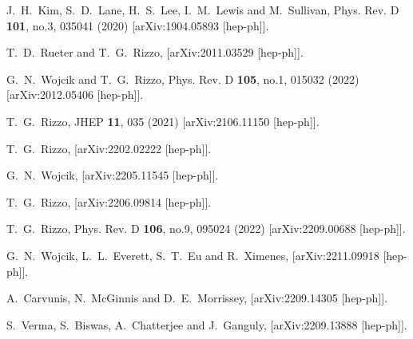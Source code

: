 \documentclass[14pt]{article}
\begin{document}
{\begin{thebibliography}{99}
J.~H.~Kim, S.~D.~Lane, H.~S.~Lee, I.~M.~Lewis and M.~Sullivan,
Phys. Rev. D \textbf{101}, no.3, 035041 (2020)
[arXiv:1904.05893 [hep-ph]].

T.~D.~Rueter and T.~G.~Rizzo,
[arXiv:2011.03529 [hep-ph]].

G.~N.~Wojcik and T.~G.~Rizzo,
Phys. Rev. D \textbf{105}, no.1, 015032 (2022)
[arXiv:2012.05406 [hep-ph]].

T.~G.~Rizzo,
JHEP \textbf{11}, 035 (2021)
[arXiv:2106.11150 [hep-ph]].

T.~G.~Rizzo,
[arXiv:2202.02222 [hep-ph]].

G.~N.~Wojcik,
[arXiv:2205.11545 [hep-ph]].

T.~G.~Rizzo,
[arXiv:2206.09814 [hep-ph]].

T.~G.~Rizzo,
Phys. Rev. D \textbf{106}, no.9, 095024 (2022)
[arXiv:2209.00688 [hep-ph]].

G.~N.~Wojcik, L.~L.~Everett, S.~T.~Eu and R.~Ximenes,
[arXiv:2211.09918 [hep-ph]].

A.~Carvunis, N.~McGinnis and D.~E.~Morrissey,
[arXiv:2209.14305 [hep-ph]].

S.~Verma, S.~Biswas, A.~Chatterjee and J.~Ganguly,
[arXiv:2209.13888 [hep-ph]].


\end{thebibliography}}
\end{document}
